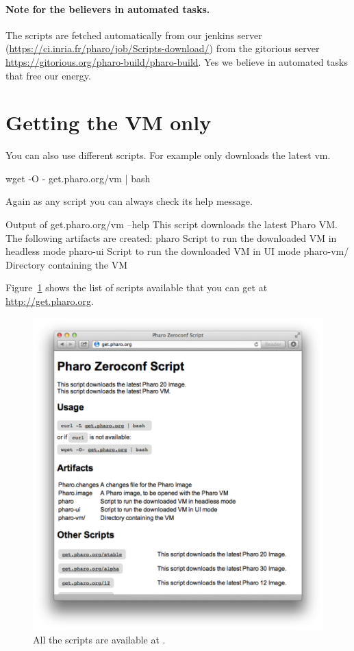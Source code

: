 \documentclass[a4paper,10pt,twoside]{book}
\begin{document}
\paragraph{Note for the believers in automated tasks.} 
The scripts are fetched automatically from our jenkins server (\url{https://ci.inria.fr/pharo/job/Scripts-download/}) from the gitorious server \mbox{\url{https://gitorious.org/pharo-build/pharo-build}.}
Yes we believe in automated tasks that free our energy. 

\section{Getting the VM only}
You can also use different scripts. For example  only downloads the latest vm.

\begin{code}{}
wget -O - get.pharo.org/vm | bash
\end{code}


Again as any script you can always check its help message.

\begin{code}[]{Output of get.pharo.org/vm --help}
This script downloads the latest Pharo VM.
The following artifacts are created:
    pharo      Script to run the downloaded VM in headless mode
    pharo-ui   Script to run the downloaded VM in UI mode
    pharo-vm/  Directory containing the VM
\end{code}


Figure~\ref{fig:website} shows the list of scripts available that you can get at \mbox{\url{http://get.pharo.org}.}

\begin{figure}[!h]
	\centering
	\includegraphics[width=\textwidth]{zeroconfwebsite}
	\caption{All the scripts are available at .\label{fig:website}}
\end{figure}
\end{document}

